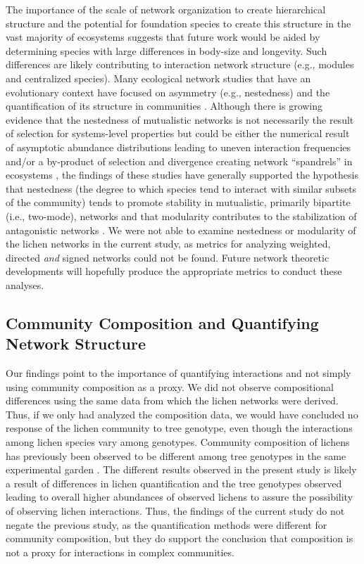 \documentclass[fleqn,12pt]{olplainarticle}
\begin{document}
The importance of the scale of network organization to create
hierarchical structure \citep{Guimaraes2020afix} and the
potential for foundation species to create this structure in the vast
majority of ecosystems \citep{Ellison2005, Whitham2006a} suggests that
future work would be aided by determining species with large
differences in body-size and longevity. Such differences are likely
contributing to interaction network structure (e.g., modules and
centralized species). Many ecological network studies that have an
evolutionary context have focused on asymmetry (e.g., nestedness) and
the quantification of its structure in communities
\citep{Bascompte2006, Diaz-Castelazo2010, Guimaraes2011,
  Thompson2013}. Although there is growing evidence that the
nestedness of mutualistic networks is not necessarily the result of
selection for systems-level properties but could be either the
numerical result of asymptotic abundance distributions leading to
uneven interaction frequencies \citep{Staniczenko2013TheNetworks}
and/or a by-product of selection and divergence creating network
``spandrels'' in ecosystems \citep{Valverde2018TheSpandrel}, the
findings of these studies have generally supported the hypothesis that
nestedness (the degree to which species tend to interact with similar
subsets of the community) tends to promote stability in mutualistic,
primarily bipartite (i.e., two-mode), networks and that modularity
contributes to the stabilization of antagonistic networks
\citep{Elias2013EvolutionaryNetwork,
  Grilli2016afix}. We were not able to examine
nestedness or modularity of the lichen networks in the current study,
as metrics for analyzing weighted, directed \textit{and} signed
networks could not be found. Future network theoretic developments
will hopefully produce the appropriate metrics to conduct these
analyses.

\subsection*{Community Composition and Quantifying Network Structure}

Our findings point to the importance of quantifying interactions and
not simply using community composition as a proxy. We did not observe
compositional differences using the same data from which the lichen
networks were derived. Thus, if we only had analyzed the composition
data, we would have concluded no response of the lichen community to
tree genotype, even though the interactions among lichen species vary
among genotypes. Community composition of lichens has previously been
observed to be different among tree genotypes in the same experimental
garden \citep{Lamit2011, Lamit2015a}. The different results observed
in the present study is likely a result of differences in lichen
quantification and the tree genotypes observed leading to overall
higher abundances of observed lichens to assure the possibility of
observing lichen interactions. Thus, the findings of the current study
do not negate the previous study, as the quantification methods were
different for community composition, but they do support the
conclusion that composition is not a proxy for interactions in complex
communities.
\end{document}
